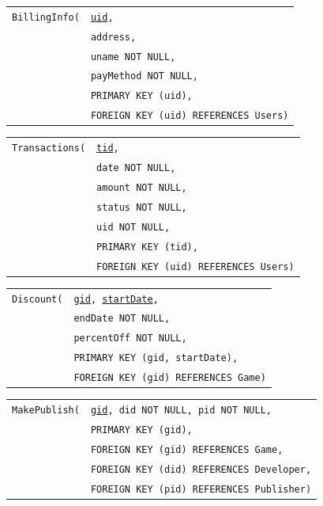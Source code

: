 \documentclass[12pt, oneside]{article}
\begin{document}
\begin{tabular}{l@{}l}
    \texttt{BillingInfo(} & \texttt{\underline{uid},}\\
                           & \texttt{address,}\\
                           & \texttt{uname NOT NULL,}\\
                           & \texttt{payMethod NOT NULL,}\\
                           & \texttt{PRIMARY KEY (uid),}\\
                           & \texttt{FOREIGN KEY (uid) REFERENCES Users)}
\end{tabular}

\begin{tabular}{l@{}l}
    \texttt{Transactions(} & \texttt{\underline{tid},}\\
                            & \texttt{date NOT NULL,}\\
                            & \texttt{amount NOT NULL,}\\
                            & \texttt{status NOT NULL,}\\
                            & \texttt{uid NOT NULL,}\\
                            & \texttt{PRIMARY KEY (tid),}\\
                            & \texttt{FOREIGN KEY (uid) REFERENCES Users)}
\end{tabular}

\begin{tabular}{l@{}l}
    \texttt{Discount(} & \texttt{\underline{gid}, \underline{startDate},}\\
                        & \texttt{endDate NOT NULL,}\\
                        & \texttt{percentOff NOT NULL,}\\
                        & \texttt{PRIMARY KEY (gid, startDate),}\\
                        & \texttt{FOREIGN KEY (gid) REFERENCES Game)}
\end{tabular}

\begin{tabular}{l@{}l}
    \texttt{MakePublish(} & \texttt{\underline{gid}, did NOT NULL, pid NOT NULL,}\\
                           & \texttt{PRIMARY KEY (gid),}\\
                           & \texttt{FOREIGN KEY (gid) REFERENCES Game,}\\
                           & \texttt{FOREIGN KEY (did) REFERENCES Developer,}\\
                           & \texttt{FOREIGN KEY (pid) REFERENCES Publisher)}
\end{tabular}
\end{document}
